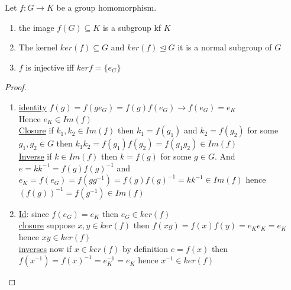 \documentclass{article}
\begin{document}
\begin{proposition}[2.4.9]
    Let $f: G \rightarrow K$ be a group homomorphism. 
    \begin{enumerate}
        \item the image $f(G) \subseteq K$ is a subgroup kf $K$
        \item The kernel $ker(f) \subseteq G$ and $ker(f) \trianglelefteq G$ it is a normal subgroup of $G$ 
        \item $f$ is injective iff $ker f = \{e_G\}$
    \end{enumerate}
   
\end{proposition}
\begin{proof}\leavevmode \\ 
    \begin{enumerate} 
        \item \underline{identity} $f(g) = f(ge_G) = f(g) f(e_G) \rightarrow f(e_G) = e_K$ \\ Hence $e_K \in Im(f)$  
        \\  \underline{Closure} if $k_1, k_2 \in Im(f)$ then $k_1 = f(g_1)$ and $k_2 = f(g_2)$ for some $g_1, g_2 \in G$ then $k_1 k_2 = f(g_1) f(g_2) = f(g_1 g_2) \in Im(f)$
        \\ \underline{Inverse} if $k \in Im(f)$ then $k = f(g)$ for some $g \in G$. And $e = k k^{-1} = f(g) f(g)^{-1} $ and $e_K= f(e_G) = f(g g^{-1}) = f(g) f(g)^{-1} = k k^{-1} \in Im(f)$ hence $(f(g))^{-1} = f(g^{-1}) \in Im(f)$
        \item \underline{Id}: since $f(e_G) = e_K$ then $e_G \in ker(f)$ \\ 
        \underline{closure} suppose $x, y \in ker(f)$ then $f(xy) = f(x) f(y) = e_K e_K = e_K$ hence $xy \in ker(f)$ \\
        \underline{inverses} now if $x \in ker(f)$ by definition $e = f(x)$ then $f(x^{-1}) = f(x)^{-1} = e_K^{-1} = e_K$ hence $x^{-1} \in ker(f)$ \\
    \end{enumerate}
\end{proof}
 
\end{document}
